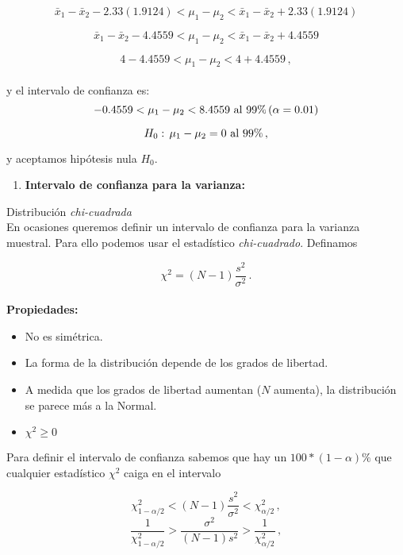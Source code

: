 \documentclass[
]{agujournal2019}
\providecommand{\tightlist}{%
  \setlength{\itemsep}{0pt}\setlength{\parskip}{0pt}}\usepackage{longtable,booktabs,array}
\begin{document}
\[\bar{x}_1-\bar{x}_2-2.33 (1.9124)<
   \mu_1-\mu_2 <
   \bar{x}_1-\bar{x}_2+2.33 (1.9124)\]

\[\bar{x}_1-\bar{x}_2-4.4559<
   \mu_1-\mu_2 <
   \bar{x}_1-\bar{x}_2+4.4559\]

\[4-4.4559<
   \mu_1-\mu_2 <
   4+4.4559\,,\]\\

y el intervalo de confianza es:\\

\[-0.4559<\mu_1-\mu_2<8.4559\,\,{\rm al}\,\,99\%\,(\alpha=0.01)\]

\[H_0:\,\mu_1 - \mu_2 = 0\,\,{\rm al}\,\,99\%\,,\]

y aceptamos hipótesis nula \(H_0\).\\

\begin{enumerate}
\def\labelenumi{(\arabic{enumi})}
\setcounter{enumi}{3}
\tightlist
\item
  \textbf{Intervalo de confianza para la varianza:}
\end{enumerate}

Distribución \emph{chi-cuadrada}\\

En ocasiones queremos definir un intervalo de confianza para la varianza
muestral. Para ello podemos usar el estadístico \emph{chi-cuadrado}.
Definamos

\[\chi^2=(N-1)\frac{s^2}{\sigma^2}\,.\]\\

\textbf{Propiedades:}

\begin{itemize}
\item No es simétrica.
\item La forma de la distribución depende de los grados de libertad.
\item A medida que los grados de libertad aumentan ($N$ aumenta),
la distribución se parece más a la Normal.
\item $\chi^2\geq0$
\end{itemize}

\vspace{0.25cm}

Para definir el intervalo de confianza sabemos que hay un
\(100*(1-\alpha)\%\) que cualquier estadístico \(\chi^2\) caiga en el
intervalo

\[\chi^2_{1-\alpha/2}<(N-1)\frac{s^2}{\sigma^2}<\chi^2_{\alpha/2}\,,\]
\[\frac{1}{\chi^2_{1-\alpha/2}}>\frac{\sigma^2}{(N-1)s^2}>\frac{1}{\chi^2_{\alpha/2}}\,,\]
\end{document}
